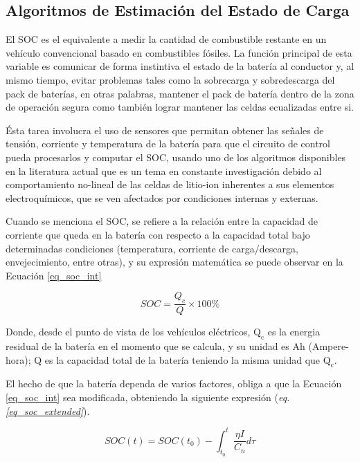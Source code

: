 \documentclass[10pt,a4paper]{article}
\begin{document}
\subsection{Algoritmos de Estimaci\'on del Estado de Carga}\label{algSoc}

\noindent El \acrshort{SOC} es el equivalente a medir la cantidad de combustible
restante en un veh\'iculo convencional basado en combustibles f\'osiles. La
funci\'on principal de esta variable es comunicar de forma instintiva el estado
de la bater\'ia al conductor y, al mismo tiempo, evitar problemas tales como la
sobrecarga y sobredescarga del pack de bater\'ias, en otras palabras, mantener
el pack de bater\'ia dentro de la zona de operaci\'on segura como tambi\'en 
lograr mantener las celdas ecualizadas entre si.

\noindent \'Esta tarea involucra el uso de sensores que permitan obtener las
señales de tensi\'on, corriente y temperatura de la bater\'ia para que el
circuito de control pueda procesarlos y computar el \acrshort{SOC},
usando uno de los algoritmos disponibles en la literatura actual que es
un tema en constante investigaci\'on debido al comportamiento no-lineal de las 
celdas de litio-ion inherentes a sus elementos electroqu\'imicos, que se ven 
afectados por condiciones internas y externas.

\newpage

\noindent Cuando se menciona el \acrshort{SOC}, se refiere a la relaci\'on entre
la capacidad de corriente que queda en la bater\'ia con respecto a la capacidad
total bajo determinadas condiciones (temperatura, corriente de carga/descarga,
envejecimiento, entre otras), y su expresi\'on matem\'atica se puede observar en
la Ecuaci\'on \ref{eq_soc_int}

\begin{equation}
    SOC = \frac{Q_c}{Q}\times100\% 
    \label{eq_soc_int}
\end{equation}

\noindent Donde, desde el punto de vista de los veh\'iculos el\'ectricos,
$\mathrm{Q_c}$ es la energia residual de la bater\'ia en el momento que se
calcula, y su unidad es Ah (Ampere-hora); Q es la capacidad total de la
bater\'ia teniendo la misma unidad que $\mathrm{Q_c}$.

\noindent El hecho de que la bater\'ia dependa de varios factores, obliga a que
la Ecuaci\'on \ref{eq_soc_int} sea modificada, obteniendo la siguiente 
expresi\'on (\emph{eq. \ref{eq_soc_extended}}).

\begin{equation}
    SOC(t) = SOC(t_0) - \int_{t_0}^t \frac{\eta I}{C_n }d\tau
    \label{eq_soc_extended}
\end{equation}
\end{document}
